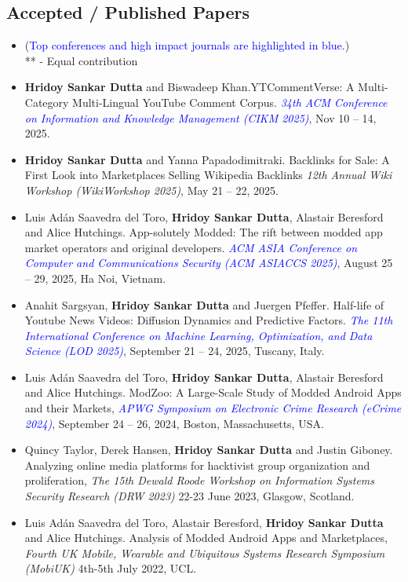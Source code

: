\documentclass[margin, centered,lmodern]{res}
\begin{document}
\begin{resume}
\section{Accepted / Published Papers}
\begin{itemize}[leftmargin=*]
\item[] (\textcolor{blue}{Top conferences and high impact journals are highlighted in blue.}) \\ ** - Equal contribution
\item \textbf{Hridoy Sankar Dutta} and Biswadeep Khan.YTCommentVerse: A Multi-Category Multi-Lingual YouTube Comment Corpus. \textit{\textcolor{blue}{34th ACM Conference on Information and Knowledge Management (CIKM 2025)}}, Nov 10 – 14, 2025.
\item \textbf{Hridoy Sankar Dutta} and Yanna Papadodimitraki. Backlinks for Sale: A First Look into Marketplaces Selling Wikipedia Backlinks \textit{12th Annual Wiki Workshop (WikiWorkshop 2025)}, May 21 – 22, 2025.
\item Luis Adán Saavedra del Toro,  \textbf{Hridoy Sankar Dutta}, Alastair Beresford and Alice Hutchings. App-solutely Modded: The rift between modded app market operators and original developers.   \textit{\textcolor{blue}{ACM ASIA Conference on Computer and Communications Security (ACM ASIACCS 2025)}}, August 25 – 29, 2025, Ha Noi, Vietnam.
\item Anahit Sargsyan, \textbf{Hridoy Sankar Dutta} and Juergen Pfeffer.  Half-life of Youtube News Videos: Diffusion Dynamics and Predictive Factors.   \textit{\textcolor{blue}{The 11th International Conference on Machine Learning, Optimization, and Data Science (LOD 2025)}}, September 21 – 24, 2025, Tuscany, Italy.
\item Luis Adán Saavedra del Toro,  \textbf{Hridoy Sankar Dutta}, Alastair Beresford and Alice Hutchings.  ModZoo: A Large-Scale Study of Modded Android Apps and their Markets,  \textit{\textcolor{blue}{APWG Symposium on Electronic Crime Research (eCrime 2024)}}, September 24 – 26, 2024, Boston, Massachusetts, USA.
\item Quincy Taylor,  Derek Hansen,  \textbf{Hridoy Sankar Dutta} and Justin Giboney. Analyzing online media platforms for hacktivist group organization and proliferation,  \textit{The 15th Dewald Roode Workshop on Information Systems Security Research (DRW 2023)} 22-23 June 2023, Glasgow, Scotland.

\item Luis Adán Saavedra del Toro,  Alastair Beresford,  \textbf{Hridoy Sankar Dutta} and Alice Hutchings. Analysis of Modded Android Apps and Marketplaces,  \textit{Fourth UK Mobile, Wearable and Ubiquitous Systems Research Symposium (MobiUK)} 4th-5th July 2022, UCL.


\end{itemize}
\end{resume}
\end{document}
